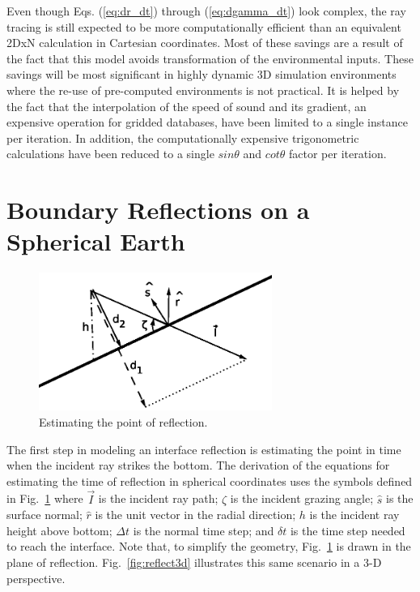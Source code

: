 \documentclass{ws-jca}
\newcommand{\threeD}{3\nobreakdash\textendash D }	%
\newcommand{\twoDxN}{2\nobreakdash\textendash DxN }
\begin{document}
Even though Eqs. (\ref{eq:dr_dt}) through (\ref{eq:dgamma_dt}) look complex, the ray tracing is still expected to be more computationally efficient than
an equivalent \twoDxN calculation in Cartesian coordinates. Most of these savings
are a result of the fact that this model avoids transformation of the
environmental inputs. 
These savings will be most significant in highly dynamic \threeD simulation
environments where the re-use of pre-computed environments is not
practical. It is helped by the fact that the interpolation of
the speed of sound and its gradient, an expensive operation for gridded
databases, have been limited to a single instance per iteration. In
addition, the computationally expensive trigonometric calculations have
been reduced to a single \(sin\theta\) and \(cot\theta\) factor per iteration.

\section{Boundary Reflections on a Spherical Earth}

\begin{figure}[th]
	\centerline{\includegraphics[width=3in]{EstPointCollision.eps}} 
	\vspace*{8pt}
	\caption{Estimating the point of reflection. }
	\label{fig:reflection_time}
\end{figure}

The first step in modeling an interface reflection is estimating the point in time when the incident ray strikes the bottom.  The derivation of the equations for estimating the time of reflection in spherical coordinates uses the symbols defined in Fig.~\ref{fig:reflection_time} where
\(\vec{I}\) is the incident ray path;
\(\zeta\) is the incident grazing angle;
\(\hat{s}\) is the surface normal;
\(\hat{r}\) is the unit vector in the radial direction;
\(h\) is the incident ray height above bottom;
\(\Delta t\) is the normal time step; and
\(\delta t\) is the time step needed to reach the interface.  
Note that, to simplify the geometry, Fig.~\ref{fig:reflection_time} is drawn in the plane of reflection.   Fig.~\ref{fig:reflect3d} illustrates this same scenario in a 3-D perspective.
\end{document}
